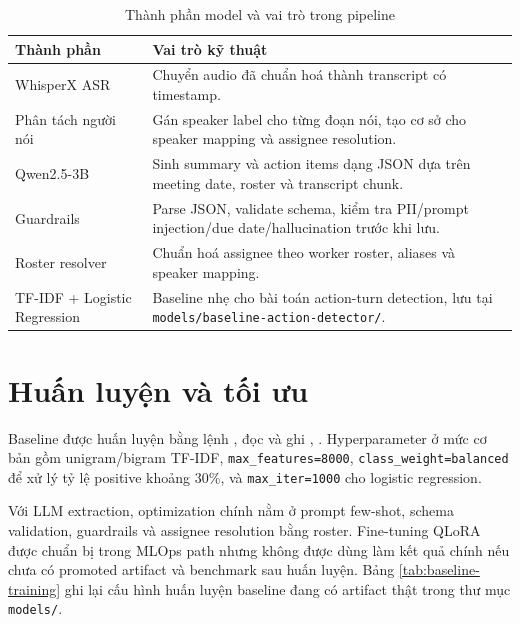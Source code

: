 \begin{table}[H]
\centering
\small
\caption{Thành phần model và vai trò trong pipeline}
\label{tab:model-components}
\begin{tabularx}{\textwidth}{@{}p{3.2cm}X@{}}
\toprule
\textbf{Thành phần} & \textbf{Vai trò kỹ thuật} \\
\midrule
WhisperX ASR & Chuyển audio đã chuẩn hoá thành transcript có timestamp. \\
Phân tách người nói & Gán speaker label cho từng đoạn nói, tạo cơ sở cho speaker mapping và assignee resolution. \\
Qwen2.5-3B & Sinh summary và action items dạng JSON dựa trên meeting date, roster và transcript chunk. \\
Guardrails & Parse JSON, validate schema, kiểm tra PII/prompt injection/due date/hallucination trước khi lưu. \\
Roster resolver & Chuẩn hoá assignee theo worker roster, aliases và speaker mapping. \\
TF-IDF + Logistic Regression & Baseline nhẹ cho bài toán action-turn detection, lưu tại \texttt{models/baseline-action-detector/}. \\
\bottomrule
\end{tabularx}
\end{table}

\section{Huấn luyện và tối ưu}

Baseline được huấn luyện bằng lệnh , đọc  và ghi , . Hyperparameter ở mức cơ bản gồm unigram/bigram TF-IDF, \texttt{max\_features=8000}, \texttt{class\_weight=balanced} để xử lý tỷ lệ positive khoảng 30\%, và \texttt{max\_iter=1000} cho logistic regression.

Với LLM extraction, optimization chính nằm ở prompt few-shot, schema validation, guardrails và assignee resolution bằng roster. Fine-tuning QLoRA được chuẩn bị trong MLOps path nhưng không được dùng làm kết quả chính nếu chưa có promoted artifact và benchmark sau huấn luyện. Bảng \ref{tab:baseline-training} ghi lại cấu hình huấn luyện baseline đang có artifact thật trong thư mục \texttt{models/}.

